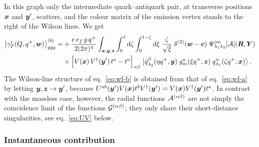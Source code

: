 In this graph only the intermediate quark--antiquark pair, at transverse positions $\bm{x}$ and $\bm{y}'$,
scatters, and the colour matrix of the emission vertex stands to the right of the Wilson lines. We get
\begin{align}
\big|\gamma_T^i(Q,q^+,\bm{w})\big\rangle^{(b)}_{q\bar q g}=&+\frac{e\,e_f\,g\,q^+}{2(2\pi)^4}\int_{\bm{x},\bm{y},\bm{z}}
\int_0^1{\rm d}\zeta\int_0^{1-\zeta}{\rm d}\xi\;\frac{\zeta}{\sqrt\xi}\;\delta^{(2)}(\bm{w}-\bm{c})\;
\Psi^{im}_{\lambda_1\lambda_2}[\mathcal{A}](\bm{R},\bm{Y})
\nonumber\\
&\times\Big[V(\bm{x})\,V^\dagger(\bm{y}')\,t^a-t^a\Big]_{\alpha\beta}\;
\big|\bar q^\beta_{\lambda_2}(\eta q^+,\bm{y})\;g^a_m(\xi q^+,\bm{z})\;q^\alpha_{\lambda_1}(\zeta q^+,\bm{x})\big\rangle\,.
\label{eq:wf-b}
\end{align}
The Wilson-line structure of eq.~\eqref{eq:wf-b} is obtained from that of eq.~\eqref{eq:wf-a} by
letting $\bm{y},\bm{z}\to\bm{y}'$, because $U^{ab}(\bm{y}')V(\bm{x})t^bV^\dagger(\bm{y}')=V(\bm{x})V^\dagger(\bm{y}')t^a$. In
contrast with the massless case, however, the radial functions $\mathcal{A}^{(\alpha\beta)}$ are not simply the
coincidence limit of the functions $\mathcal{G}^{(\alpha\beta)}$; they only share their short-distance
singularities, see eq.~\eqref{eq:UV} below.

\subsubsection{Instantaneous contribution}
\label{sec:inst}


